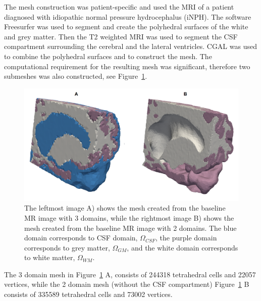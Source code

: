 \documentclass[12pt,a4paper]{article}
\begin{document}
The mesh construction was patient-specific and used the MRI of a patient diagnosed with idiopathic normal pressure hydrocephalus (iNPH). The software Freesurfer was used to segment and create the polyhedral surfaces of the white and grey matter. Then the T2 weighted MRI \cite{ringstad2018brain} was used to segment the CSF compartment surrounding the cerebral and the lateral ventricles. CGAL \cite{cgal:rty-m3-18b} was used to combine the polyhedral surfaces and to construct the mesh. The computational requirement for the resulting mesh was significant, therefore two submeshes was also constructed, see Figure~\ref{Fig::Mesh}.
\begin{figure}
\centering
\includegraphics[scale=0.2]{mesh.png} 
\caption{The leftmost image A) shows the mesh created from the baseline MR image with 3 domains, while the rightmost image  B) shows the mesh created from the baseline MR image with 2 domains. The blue domain corresponds to CSF domain, $\Omega_{CSF}$, the purple domain corresponds to grey matter,  $\Omega_{GM}$, and the white domain corresponds to white matter, $\Omega_{WM}$. }
\label{Fig::Mesh}
\end{figure}
The 3 domain mesh in Figure~\ref{Fig::Mesh} A, consists of 244318 tetrahedral cells and 22057 vertices, while the 2 domain mesh (without the CSF compartment) Figure~\ref{Fig::Mesh} B consists of 335589 tetrahedral cells and 73002 vertices. 
\end{document}
